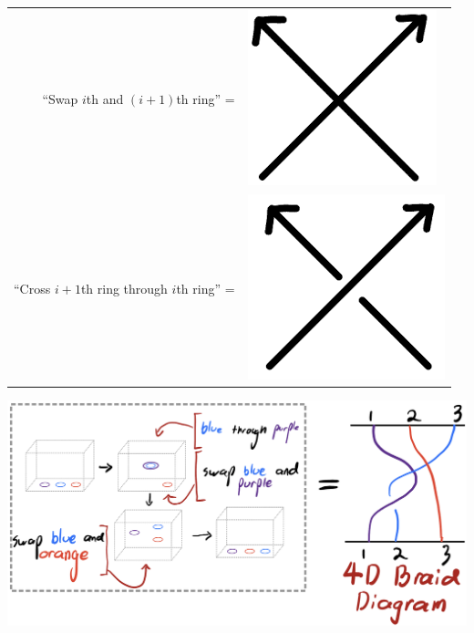 \documentclass[14pt, xcolor=svgnames]{beamer}
\begin{document}
\begin{frame}
    \vfill
    \begin{tabular}{r l}
        ``Swap \( i \)th and \( (i + 1) \)th ring'' =& 
        \begin{minipage}{0.1\columnwidth}
        \includegraphics[scale = 0.17]{images/virtual crossing.png}
        \end{minipage} \\
    
        ``Cross \( i + 1 \)th ring through \( i \)th ring'' =&
        \begin{minipage}{0.1\columnwidth}
        \includegraphics[scale = 0.17]{images/over crossing.png}
        \end{minipage} \\
    \end{tabular}
    
    \begin{center}
    \includegraphics[width = \textwidth]{images/4D braid diagrams.png}
    \end{center}
    \vfill
\end{frame}
\end{document}
